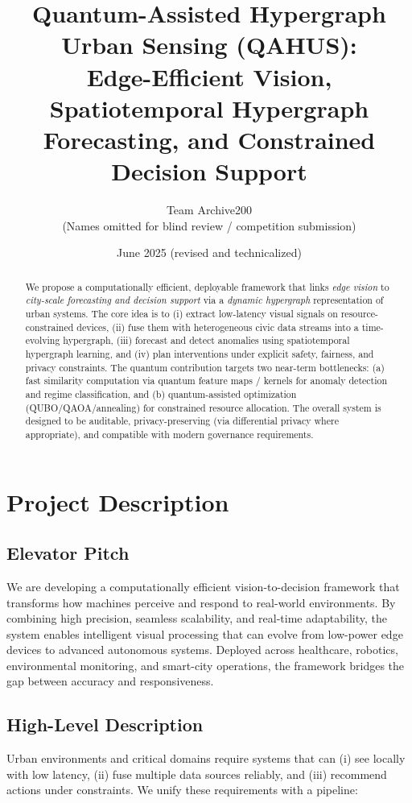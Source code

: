 \documentclass[11pt]{article}
\title{Quantum-Assisted Hypergraph Urban Sensing (QAHUS):\\
Edge-Efficient Vision, Spatiotemporal Hypergraph Forecasting, and Constrained Decision Support}
\author{Team Archive200 \\
\small (Names omitted for blind review / competition submission)}
\date{June 2025 (revised and technicalized)}
\begin{document}
\maketitle

\begin{abstract}
We propose a computationally efficient, deployable framework that links \emph{edge vision} to
\emph{city-scale forecasting and decision support} via a \emph{dynamic hypergraph} representation of urban systems.
The core idea is to (i) extract low-latency visual signals on resource-constrained devices, (ii) fuse them with
heterogeneous civic data streams into a time-evolving hypergraph, (iii) forecast and detect anomalies using
spatiotemporal hypergraph learning, and (iv) plan interventions under explicit safety, fairness, and privacy
constraints. The quantum contribution targets two near-term bottlenecks: (a) fast similarity computation via
quantum feature maps / kernels for anomaly detection and regime classification, and (b) quantum-assisted
optimization (QUBO/QAOA/annealing) for constrained resource allocation. The overall system is designed to be
auditable, privacy-preserving (via differential privacy where appropriate), and compatible with modern
governance requirements.
\end{abstract}

\section{Project Description}

\subsection{Elevator Pitch}
We are developing a computationally efficient vision-to-decision framework that transforms how machines
perceive and respond to real-world environments. By combining high precision, seamless scalability, and
real-time adaptability, the system enables intelligent visual processing that can evolve from low-power
edge devices to advanced autonomous systems. Deployed across healthcare, robotics, environmental monitoring,
and smart-city operations, the framework bridges the gap between accuracy and responsiveness.

\subsection{High-Level Description}
Urban environments and critical domains require systems that can (i) see locally with low latency, (ii) fuse
multiple data sources reliably, and (iii) recommend actions under constraints. We unify these requirements
with a pipeline:
\end{document}
